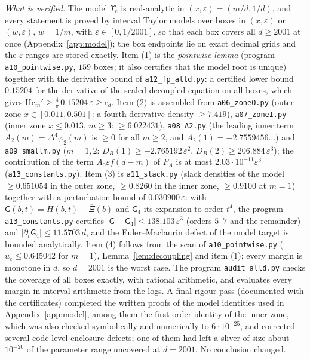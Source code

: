 \documentclass[11pt]{amsart}
\theoremstyle{definition}
\theoremstyle{remark}
\numberwithin{equation}{section}
\newcommand{\Xb}{\overline{\Xi}}
\begin{document}
\emph{What is verified.} The model $\Upsilon_e$ is real-analytic in $(x,\varepsilon)=(m/d,1/d)$, and every statement is
proved by interval Taylor models over boxes in $(x,\varepsilon)$ or $(w,\varepsilon)$, $w=1/m$, with
$\varepsilon\in[0,1/2001]$, so that each box covers all $d\ge2001$ at once (Appendix~\ref{app:model}); the box endpoints lie
on exact decimal grids and the $\varepsilon$-ranges are stored exactly. Item (1) is the \emph{pointwise lemma} (program
\texttt{a10\_pointwise.py}, $159$ boxes; it also certifies that the model root is unique) together with the derivative
bound of \texttt{a12\_fp\_alld.py}: a certified lower bound $0.15204$ for the derivative of the scaled decoupled equation
on all boxes, which gives $\mathrm{Hc}_m'\ge\frac4\pi\,0.15204\,\varepsilon\ge c_d$. Item (2) is assembled from
\texttt{a06\_zoneO.py} (outer zone $x\in[0.011,0.501]$: a fourth-derivative density $\ge7.419$), \texttt{a07\_zoneI.py}
(inner zone $x\le0.013$, $m\ge3$: $\ge6.022431$), \texttt{a08\_A2.py} (the leading inner term $A_2(m)=\Delta^4\varphi_2(m)$
is $\ge0$ for all $m\ge2$, and $A_2(1)=-2.7559456\ldots$) and \texttt{a09\_smallm.py} ($m=1,2$:
$D_B(1)\ge-2.765192\,\varepsilon^2$, $D_B(2)\ge206.884\,\varepsilon^3$); the contribution of the term $A_0\varepsilon f(d-m)$
of $F_A$ is at most $2.03\cdot10^{-11}\varepsilon^3$ (\texttt{a13\_constants.py}). Item (3) is \texttt{a11\_slack.py}
(slack densities of the model $\ge0.651054$ in the outer zone, $\ge0.8260$ in the inner zone, $\ge0.9100$ at $m=1$)
together with a perturbation bound of $0.030900\,\varepsilon$: with $\mathsf G(b,t)=H(b,t)-\Xb(b)$ and $\mathsf G_4$ its expansion to order
$t^4$, the program \texttt{a13\_constants.py} certifies $|\mathsf G-\mathsf G_4|\le138.103\,\varepsilon^3$ (orders $5$--$7$ and the
remainder) and $|\partial_t\mathsf G_4|\le11.5703\,d$, and the Euler--Maclaurin defect of the model target is bounded
analytically. Item (4) follows from the scan of \texttt{a10\_pointwise.py} ($u_e\le0.645042$ for $m=1$),
Lemma~\ref{lem:decoupling} and item (1); every margin is monotone in $d$, so $d=2001$ is the worst case. The program
\texttt{audit\_alld.py} checks the coverage of all boxes exactly, with rational arithmetic, and evaluates every margin in
interval arithmetic from the logs. A final rigour pass (documented with the certificates) completed the written proofs of
the model identities used in Appendix~\ref{app:model}, among them the first-order identity of the inner zone, which was
also checked symbolically and numerically to $6\cdot10^{-25}$, and corrected several code-level enclosure defects; one
of them had left a sliver of size about $10^{-20}$ of the parameter range uncovered at $d=2001$. No conclusion changed.
\end{document}
